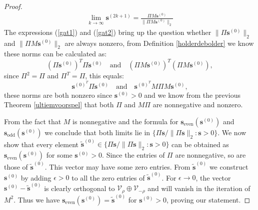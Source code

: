 \documentclass[a4paper,11pt]{report}
\begin{document}
\begin{proof}
\begin{eqnarray}
 \lim_{k \to \infty} \mathbf{s}^{(2k+1)} = \frac{\Pi M \mathbf{s}^{(0)}}{\|\Pi M \mathbf{s}^{(0)}\|_2}\label{gat2}
 \end{eqnarray}
The expressions (\ref{gat1}) and (\ref{gat2}) bring up the question whether $\|\Pi \mathbf{s}^{(0)}\|_2$ and $\|\Pi M \mathbf{s}^{(0)}\|_2$ are 
always 
nonzero, from Definition \ref{holderdebolder} we know these norms can be 
calculated as:
$$(\Pi\mathbf{s}^{(0)})^T \Pi\mathbf{s}^{(0)} \quad \text{and} \quad (\Pi M \mathbf{s}^{(0)})^T (\Pi M \mathbf{s}^{(0)}),$$
since $\Pi^2 = \Pi$ and $\Pi^T = \Pi$, this equals:
$$\mathbf{s}^{(0)}^T \Pi\mathbf{s}^{(0)} \quad \text{and} \quad \mathbf{s}^{(0)}^T M\Pi M \mathbf{s}^{(0)},$$
these norms are both nonzero since $\mathbf{s}^{(0)} > 0$ and 
 we know from the previous Theorem \ref{ultiemvoorspel} that both $\Pi$ and $M\Pi$ are nonnegative and nonzero.
 
 From the fact that $M$ is nonnegative and the formula for $\mathbf{s}_{\text{even}}(\mathbf{s}^{(0)})$ 
 and $\mathbf{s}_{\text{odd}}(\mathbf{s}^{(0)})$ we conclude that both limits lie in 
 $\{\Pi\mathbf{s}/\|\Pi \mathbf{s}\|_2: \mathbf{s}> 0\}$. We now show that every 
 element $\mathbf{\tilde{s}}^{(0)} \in \{\Pi\mathbf{s}/\|\Pi \mathbf{s}\|_2: \mathbf{s}> 0\}$ 
 can be obtained as $\mathbf{s}_{\text{even}}(\mathbf{s}^{(0)})$ for some $\mathbf{s}^{(0)}  
 > 0$. Since the entries of $\Pi$ are nonnegative, so are those of 
 $\mathbf{\tilde{s}}^{(0)}$. This vector may have some zero entries. From $\mathbf{\tilde{s}}^{(0)}$ 
 we construct $\mathbf{s}^{(0)}$ by adding $\epsilon > 0$ to all the zero entries of 
 $\mathbf{\tilde{s}}^{(0)}$. For $\epsilon \to 0$, the vector $\mathbf{s}^{(0)} - \mathbf{\tilde{s}}^{(0)}$ is 
 clearly orthogonal to $\mathcal{V}_\rho \oplus \mathcal{V}_{-\rho}$ and will 
 vanish in the iteration of $M^2$. Thus we have $\mathbf{s}_{\text{even}}(\mathbf{s}^{(0)}) = \mathbf{\tilde{s}}^{(0)}$ 
 for $\mathbf{s}^{(0)} > 0$, proving our statement.
 

\end{proof}
\end{document}
